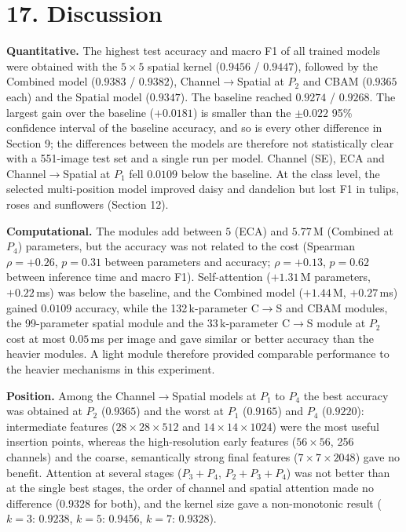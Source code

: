 \documentclass[10pt]{article}
\begin{document}
\section*{17. Discussion}

\textbf{Quantitative.} The highest test accuracy and macro F1 of all trained
models were obtained with the $5\times5$ spatial kernel ($0.9456$ / $0.9447$),
followed by the Combined model ($0.9383$ / $0.9382$), Channel$\rightarrow$Spatial
at $P_2$ and CBAM ($0.9365$ each) and the Spatial model ($0.9347$). The
baseline reached $0.9274$ / $0.9268$. The largest gain over the baseline
($+0.0181$) is smaller than the $\pm0.022$ 95\% confidence interval of the
baseline accuracy, and so is every other difference in Section 9; the
differences between the models are therefore not statistically clear with a
551-image test set and a single run per model. Channel (SE), ECA and
Channel$\rightarrow$Spatial at $P_1$ fell $0.0109$ below the baseline. At the
class level, the selected multi-position model improved daisy and dandelion
but lost F1 in tulips, roses and sunflowers (Section 12).

\textbf{Computational.} The modules add between $5$ (ECA) and $5.77$\,M
(Combined at $P_4$) parameters, but the accuracy was not related to the cost
(Spearman $\rho=+0.26$, $p=0.31$ between parameters and accuracy;
$\rho=+0.13$, $p=0.62$ between inference time and macro F1). Self-attention
($+1.31$\,M parameters, $+0.22$\,ms) was below the baseline, and the Combined
model ($+1.44$\,M, $+0.27$\,ms) gained $0.0109$ accuracy, while the
132\,k-parameter C$\rightarrow$S and CBAM modules, the 99-parameter spatial
module and the 33\,k-parameter C$\rightarrow$S module at $P_2$ cost at most
$0.05$\,ms per image and gave similar or better accuracy than the heavier
modules. A light module therefore provided comparable performance to the
heavier mechanisms in this experiment.

\textbf{Position.} Among the Channel$\rightarrow$Spatial models at $P_1$ to
$P_4$ the best accuracy was obtained at $P_2$ ($0.9365$) and the worst at
$P_1$ ($0.9165$) and $P_4$ ($0.9220$): intermediate features
($28\times28\times512$ and $14\times14\times1024$) were the most useful
insertion points, whereas the high-resolution early features ($56\times56$,
256 channels) and the coarse, semantically strong final features
($7\times7\times2048$) gave no benefit. Attention at several stages ($P_3{+}P_4$,
$P_2{+}P_3{+}P_4$) was not better than at the single best stages, the order
of channel and spatial attention made no difference ($0.9328$ for both), and
the kernel size gave a non-monotonic result ($k=3$: $0.9238$, $k=5$:
$0.9456$, $k=7$: $0.9328$).
\end{document}
